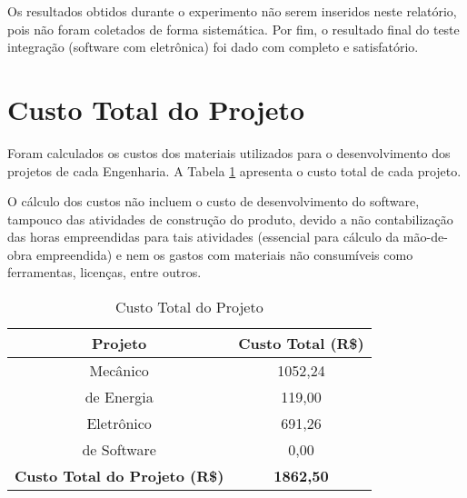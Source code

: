 		Os resultados obtidos durante o experimento não serem inseridos neste relatório, pois não foram coletados de forma sistemática. Por fim, o resultado final do teste integração (software com eletrônica) foi dado com completo e satisfatório.

	\newpage
	\section{Custo Total do Projeto}
	\label{sec:inte44}

		Foram calculados os custos dos materiais utilizados para o desenvolvimento dos projetos de cada Engenharia. A Tabela \ref{custototal} apresenta o custo total de cada projeto.

		O cálculo dos custos não incluem o custo de desenvolvimento do software, tampouco das atividades de construção do produto, devido a não contabilização das horas empreendidas para tais atividades (essencial para cálculo da mão-de-obra empreendida) e nem os gastos com materiais não consumíveis como ferramentas, licenças, entre outros.
		
		\begin{table}[!htpb]
		\centering
		\caption{Custo Total do Projeto}
		\label{custototal}
		\begin{tabular}{|c|c|}
		\hline
		\rowcolor[HTML]{C0C0C0} 
		{\color[HTML]{000000} \textbf{Projeto}} & {\color[HTML]{000000} \textbf{Custo Total (R\$)}} \\ \hline
		{\color[HTML]{000000} Mecânico} & {\color[HTML]{000000} 1052,24} \\ \hline
		{\color[HTML]{000000} de Energia} & {\color[HTML]{000000} 119,00} \\ \hline
		{\color[HTML]{000000} Eletrônico} & {\color[HTML]{000000} 691,26} \\ \hline
		{\color[HTML]{000000} de Software} & {\color[HTML]{000000} 0,00} \\ \hline
		\rowcolor[HTML]{EFEFEF} 
		{\color[HTML]{000000} \textbf{Custo Total do Projeto (R\$)}} & {\color[HTML]{000000} \textbf{1862,50}} \\ \hline
		\end{tabular}
		\end{table}